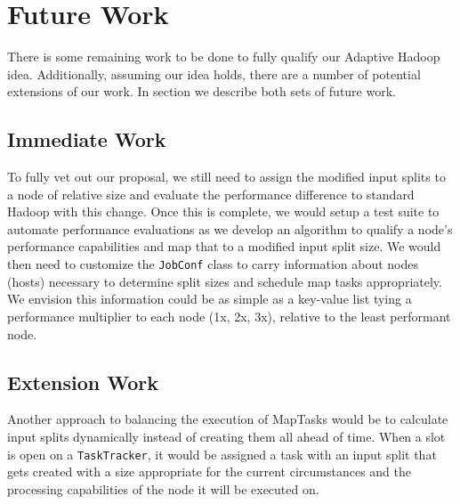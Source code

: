 \section{Future Work}
\label{section:futurework}

There is some remaining work to be done to fully qualify our Adaptive Hadoop idea. Additionally, 
assuming our idea holds, there are a number of potential extensions of our work. In section we
describe both sets of future work.

\subsection{Immediate Work}
To fully vet out our proposal, we still need to assign the modified input splits to a node
of relative size and evaluate the performance difference to standard Hadoop with this change.
Once this is complete, we would setup a test suite to automate performance evaluations as we
develop an algorithm to qualify a node's performance capabilities and map that to a modified
input split size. We would then need to customize the \texttt{JobConf} class to carry
information about nodes (hosts) necessary to determine split sizes and schedule map tasks
appropriately. We envision this information could be as simple as a key-value list tying
a performance multiplier to each node (1x, 2x, 3x), relative to the least performant node.

\subsection{Extension Work}
Another approach to balancing the execution of MapTasks would be to calculate input splits
dynamically instead of creating them all ahead of time. When a slot is open on a \texttt{TaskTracker}, it would
be assigned a task with an input split that gets created with a size appropriate for the current circumstances
and the processing capabilities of the node it will be executed on.
